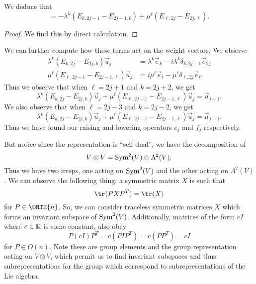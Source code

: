 \begin{prop}
We deduce that 
\begin{equation}
[h_{j},\lambda^{k}(E_{k,2j}-E_{2j,k})+\mu^{\ell}(E_{\ell,2j-1}-E_{2j-1,\ell})]=-\lambda^{k}(E_{k,2j-1}-E_{2j-1,k})+\mu^{\ell}(E_{\ell,2j}-E_{2j,\ell}).
\end{equation}
\end{prop}
\begin{proof}
We find this by direct calculation.
\end{proof}

\vskip 1pc
We can further compute how these terms act on the weight
vectors. We observe
\begin{subequations}
\begin{align}
\lambda^{k}(E_{k,2j}-E_{2j,k})\vec{u}_{j}&=\lambda^{k}\vec{e}_{k}-i\lambda^{k}\delta_{k,2j-1}\vec{e}_{2j}\\
\mu^{\ell}(E_{\ell,2j-1}-E_{2j-1,\ell})\vec{u}_{j}&=i\mu^{\ell}\vec{e}_{\ell}-\mu^{\ell}\delta_{\ell,2j}\vec{e}_{\ell}.
\end{align}
\end{subequations}
Thus we observe that when $\ell=2j+1$ and $k=2j+2$, we get
\begin{equation}
\lambda^{k}(E_{k,2j}-E_{2j,k})\vec{u}_{j}+\mu^{\ell}(E_{\ell,2j-1}-E_{2j-1,\ell})\vec{u}_{j}=\vec{u}_{j+1}.
\end{equation}
We also observe that when $\ell=2j-3$ and $k=2j-2$, we get
\begin{equation}
\lambda^{k}(E_{k,2j}-E_{2j,k})\vec{u}_{j}+\mu^{\ell}(E_{\ell,2j-1}-E_{2j-1,\ell})\vec{u}_{j}=\vec{u}_{j-1}.
\end{equation}
Thus we have found our raising and lowering operators $e_{j}$ and
$f_{j}$ respectively. 

But notice since the representation is ``self-dual'', we have the
decomposition of
\begin{equation}
V\otimes V={\rm Sym}^{2}(V)\oplus\Lambda^{2}(V).
\end{equation}
Thus we have two irreps, one acting on ${\rm Sym}^{2}(V)$ and the
other acting on $\Lambda^{2}(V)$. We can observe the following
thing: a symmetric matrix $X$ is such that
\begin{equation}
\tr(PXP^{T})=\tr(X)
\end{equation}
for $P\in \ORTH{n}$. So, we can consider traceless symmetric matrices
$X$ which forms an invariant subspace of ${\rm
  Sym}^{2}(V)$. Additionally, matrices of the form $cI$ where
$c\in\Bbb{R}$ is some constant, also obey
\begin{equation}
P(cI)P^{T}=c(PIP^{T})=c(PP^{T})=cI
\end{equation}
for $P\in O(n)$. Note these are group elements and the group
representation acting on $V\otimes V$, which permit us to find
invariant subspaces and thus subrepresentations for the group
which correspond to subrepresentations of the Lie algebra.

